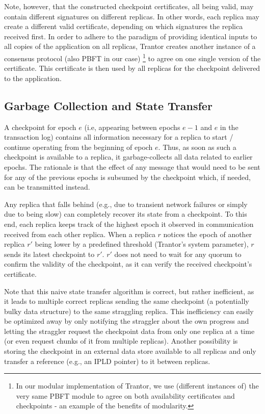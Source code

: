 \documentclass{article}
\begin{document}
Note, however, that the constructed checkpoint certificates, all being valid,
may contain different signatures on different replicas.
In other words, each replica may create a different valid certificate,
depending on which signatures the replica received first.
In order to adhere to the paradigm of providing identical inputs to all copies of the application on all replicas,
Trantor creates another instance of a consensus protocol (also PBFT in our case)%
\footnote{In our modular implementation of Trantor, we use (different instances of) the very same PBFT module
to agree on both availability certificates and checkpoints - an example of the benefits of modularity.}
to agree on one single version of the certificate.
This certificate is then used by all replicas for the checkpoint delivered to the application.

\subsection{Garbage Collection and State Transfer}
\label{sec:garbate-collection-state-transfer}

A checkpoint for epoch $e$ (i.e, appearing between epochs $e-1$ and $e$ in the transaction log)
contains all information necessary for a replica to start / continue operating from the beginning of epoch $e$.
Thus, as soon as such a checkpoint is available to a replica, it garbage-collects all data related to earlier epochs.
The rationale is that the effect of any message that would need to be sent for any of the previous epochs is subsumed by the checkpoint which,
if needed, can be transmitted instead.

Any replica that falls behind (e.g., due to transient network failures or simply due to being slow) can completely recover its state from a checkpoint.
To this end, each replica keeps track of the highest epoch it observed in communication received from each other replica.
When a replica $r$ notices the epoch of another replica $r'$ being lower by a predefined threshold (Trantor’s system parameter),
$r$ sends its latest checkpoint to $r'$.
$r'$ does not need to wait for any quorum to confirm the validity of the checkpoint, as it can verify the received checkpoint’s certificate.

Note that this naive state transfer algorithm is correct, but rather inefficient,
as it leads to multiple correct replicas sending the same checkpoint (a potentially bulky data structure) to the same straggling replica.
This inefficiency can easily be optimized away by only notifying the straggler about the own progress
and letting the straggler request the checkpoint data from only one replica at a time (or even request chunks of it from multiple replicas).
Another possibility is storing the checkpoint in an external data store available to all replicas
and only transfer a reference (e.g., an IPLD pointer) to it between replicas.
\end{document}
